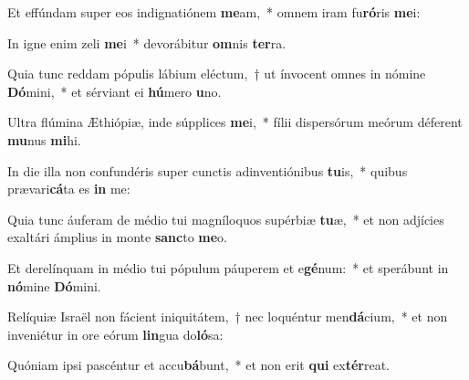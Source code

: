 \item Et effúndam super eos indignatiónem \textbf{me}am,~* omnem iram fu\textbf{ró}ris \textbf{me}i:
\item In igne enim zeli \textbf{me}i~* devorábitur \textbf{om}nis \textbf{ter}ra.
\item Quia tunc reddam pópulis lábium eléctum,~† ut ínvocent omnes in nómine \textbf{Dó}mini,~* et sérviant ei \textbf{hú}mero \textbf{u}no.
\item Ultra flúmina Æthiópiæ, inde súpplices \textbf{me}i,~* fílii dispersórum meórum déferent \textbf{mu}nus \textbf{mi}hi.
\item In die illa non confundéris super cunctis adinventiónibus \textbf{tu}is,~* quibus prævari\textbf{cá}ta es \textbf{in} me:
\item Quia tunc áuferam de médio tui magníloquos supérbiæ \textbf{tu}æ,~* et non adjícies exaltári ámplius in monte \textbf{sanc}to \textbf{me}o.
\item Et derelínquam in médio tui pópulum páuperem et e\textbf{gé}num:~* et sperábunt in \textbf{nó}mine \textbf{Dó}mini.
\item Relíquiæ Israël non fácient iniquitátem,~† nec loquéntur men\textbf{dá}cium,~* et non inveniétur in ore eórum \textbf{lin}gua do\textbf{ló}sa:
\item Quóniam ipsi pascéntur et accu\textbf{bá}bunt,~* et non erit \textbf{qui} ex\textbf{tér}reat.
